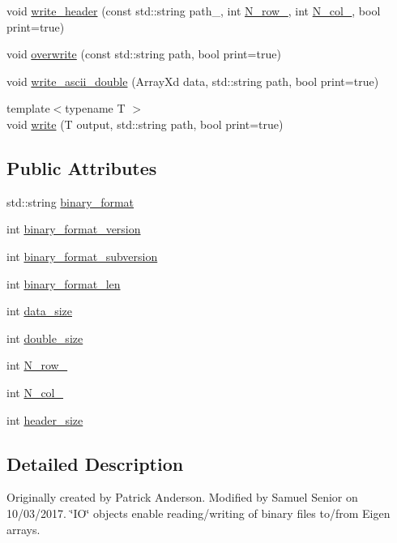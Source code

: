 \begin{DoxyCompactItemize}
\item 
void \hyperlink{class_i_o_a0db950886bb1e6d5571330f771974c4e}{write\+\_\+header} (const std\+::string path\+\_\+, int \hyperlink{class_i_o_ab8aa1490df2e2e758766030afdae3a40}{N\+\_\+row\+\_\+}, int \hyperlink{class_i_o_a64aae2d2be35348233f8ddac4d6791f2}{N\+\_\+col\+\_\+}, bool print=true)
\item 
void \hyperlink{class_i_o_a0fd7211866348cd3acc26d1ed17c100c}{overwrite} (const std\+::string path, bool print=true)
\item 
void \hyperlink{class_i_o_a20602422f0a6615b265c96fc02523e6f}{write\+\_\+ascii\+\_\+double} (Array\+Xd data, std\+::string path, bool print=true)
\item 
{\footnotesize template$<$typename T $>$ }\\void \hyperlink{class_i_o_ac84ca0cd185f0df4ea871710120577d6}{write} (T output, std\+::string path, bool print=true)
\end{DoxyCompactItemize}
\subsection*{Public Attributes}
\begin{DoxyCompactItemize}
\item 
std\+::string \hyperlink{class_i_o_a254c13a437051a09be72f77173017576}{binary\+\_\+format}
\item 
int \hyperlink{class_i_o_aaf91ba1d8be1503b44b2b1b1b666303b}{binary\+\_\+format\+\_\+version}
\item 
int \hyperlink{class_i_o_ad5c0c344b35565bb355c5d714121787b}{binary\+\_\+format\+\_\+subversion}
\item 
int \hyperlink{class_i_o_a2a1699a4cde1ce8631ae0309bc75d336}{binary\+\_\+format\+\_\+len}
\item 
int \hyperlink{class_i_o_a39a8a0474a288522d847f6be0fb2403f}{data\+\_\+size}
\item 
int \hyperlink{class_i_o_a3af3bf77eacd18c1c50cbf78b46c4228}{double\+\_\+size}
\item 
int \hyperlink{class_i_o_ab8aa1490df2e2e758766030afdae3a40}{N\+\_\+row\+\_\+}
\item 
int \hyperlink{class_i_o_a64aae2d2be35348233f8ddac4d6791f2}{N\+\_\+col\+\_\+}
\item 
int \hyperlink{class_i_o_aee540c40b18d5f9990bf8d7e12cb0827}{header\+\_\+size}
\end{DoxyCompactItemize}


\subsection{Detailed Description}
Originally created by Patrick Anderson. Modified by Samuel Senior on 10/03/2017. \char`\"{}\+I\+O\char`\"{} objects enable reading/writing of binary files to/from Eigen arrays. 

